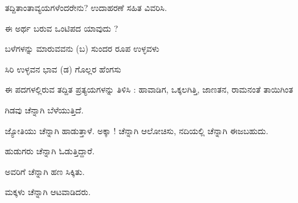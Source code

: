 \vspace{2.5pt plus 3pt minus 0.5pt}\noindent\hspace*{1.2em}\hspace{0.55em}ತದ್ದಿತಾಂತಾವ್ಯಯಗಳೆಂದರೇನು? ಉದಾಹರಣೆ ಸಹಿತ ವಿವರಿಸಿ.\par

\vspace{2.5pt plus 3pt minus 0.5pt}\noindent\hspace*{1.2em}\hspace{0.55em}ಈ ಅರ್ಥ ಬರುವ ಒಂಟಿಪದ ಯಾವುದು ?\par

\vspace{2.5pt plus 3pt minus 0.5pt}\noindent\hspace*{1.2em}\hspace{0.55em}ಬಳೆಗಳನ್ನು ಮಾರುವವನು (ಬ) ಸುಂದರ ರೂಪ ಉಳ್ಳವಳು\par

\vspace{2.5pt plus 3pt minus 0.5pt}\noindent\hspace*{1.2em}\hspace{0.55em}ಸಿರಿ ಉಳ್ಳವನ ಭಾವ (ಡ) ಗೊಲ್ಲರ ಹೆಂಗಸು\par

\vspace{2.5pt plus 3pt minus 0.5pt}\noindent\hspace*{1.2em}\hspace{0.55em}ಈ ಪದಗಳಲ್ಲಿರುವ ತದ್ದಿತ ಪ್ರತ್ಯಯಗಳನ್ನು ತಿಳಿಸಿ : ಹಾವಾಡಿಗ, ಒಕ್ಕಲಗಿತ್ತಿ, ಜಾಣತನ, ರಾಮನಂತೆ ತಾಯಿಗಿಂತ\par



\noindent\hspace*{2.2em}ಗಿಡವು ಚೆನ್ನಾಗಿ ಬೆಳೆಯುತ್ತಿದೆ.\par

\indent ಜ್ಯೋತಿಯು ಚೆನ್ನಾಗಿ ಹಾಡುತ್ತಾಳೆ. ಅಕ್ಕಾ ! ಚೆನ್ನಾಗಿ ಆಲೋಚಿಸು, ನದಿಯಲ್ಲಿ ಚೆನ್ನಾಗಿ ಈಜಬಹುದು.\par

\noindent\hspace*{2.2em}ಹುಡುಗರು ಚೆನ್ನಾಗಿ ಓಡುತ್ತಿದ್ದಾರೆ.\par

\noindent\hspace*{2.2em}ಅವರಿಗೆ ಚೆನ್ನಾಗಿ ಹಣ ಸಿಕ್ಕಿತು.\par

\noindent\hspace*{2.2em}ಮಕ್ಕಳು ಚೆನ್ನಾಗಿ ಆಟವಾಡಿದರು.\par

